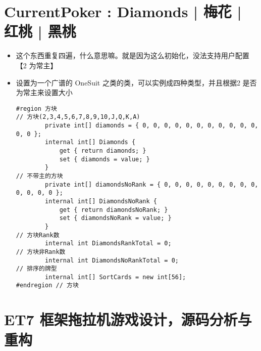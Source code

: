 \documentclass[9pt, b5paper]{article}
\begin{document}
\section{CurrentPoker : Diamonds | 梅花 | 红桃 | 黑桃}
\label{sec-2}
\begin{itemize}
\item 这个东西重复四遍，什么意思嘛。就是因为这么初始化，没法支持用户配置【2 为常主】
\item 设置为一个广谱的 OneSuit 之类的类，可以实例成四种类型，并且根据2 是否为常主来设置大小
\begin{verbatim}
#region 方块
// 方块(2,3,4,5,6,7,8,9,10,J,Q,K,A)
        private int[] diamonds = { 0, 0, 0, 0, 0, 0, 0, 0, 0, 0, 0, 0, 0 };
        internal int[] Diamonds {
            get { return diamonds; }
            set { diamonds = value; }
        }
// 不带主的方块
        private int[] diamondsNoRank = { 0, 0, 0, 0, 0, 0, 0, 0, 0, 0, 0, 0, 0 };
        internal int[] DiamondsNoRank {
            get { return diamondsNoRank; }
            set { diamondsNoRank = value; }
        }
// 方块Rank数
        internal int DiamondsRankTotal = 0;
// 方块非Rank数
        internal int DiamondsNoRankTotal = 0;
// 排序的牌型
        internal int[] SortCards = new int[56];
#endregion // 方块
\end{verbatim}
\end{itemize}

\section{ET7 框架拖拉机游戏设计，源码分析与重构}
\label{sec-3}
\end{document}
